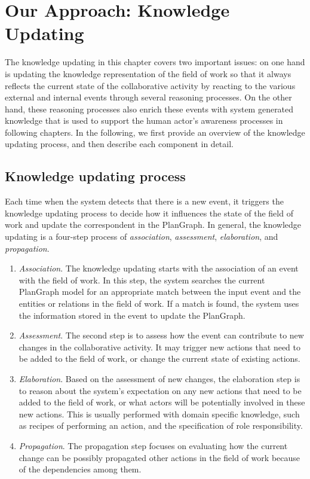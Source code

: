 \graphicspath{{Figures/}}

\chapter{Our Approach: Knowledge Updating} %
\label{cha:knowledge_updating}
The knowledge updating in this chapter covers two important issues: on one hand is updating the knowledge representation of the field of work so that it always reflects the current state of the collaborative activity by reacting to the various external and internal events through several reasoning processes. On the other hand, these reasoning processes also enrich these events with system generated knowledge that is used to support the human actor's awareness processes in following chapters. In the following, we first provide an overview of the knowledge updating process, and then describe each component in detail.

\section{Knowledge updating process} %
\label{sec:knowledge_updating_process}
Each time when the system detects that there is a new event, it triggers the knowledge updating process to decide how it influences the state of the field of work and update the correspondent in the PlanGraph. In general, the knowledge updating is a four-step process of \emph{association}, \emph{assessment}, \emph{elaboration}, and \emph{propagation}.
\begin{enumerate}
	\item \emph{Association}. The knowledge updating starts with the association of an event with the field of work. In this step, the system searches the current PlanGraph model for an appropriate match between the input event and the entities or relations in the field of work. If a match is found, the system uses the information stored in the event to update the PlanGraph.
	\item \emph{Assessment}. The second step is to assess how the event can contribute to new changes in the collaborative activity. It may trigger new actions that need to be added to the field of work, or change the current state of existing actions. 
	\item \emph{Elaboration}. Based on the assessment of new changes, the elaboration step is to reason about the system's expectation on any new actions that need to be added to the field of work, or what actors will be potentially involved in these new actions. This is usually performed with domain specific knowledge, such as recipes of performing an action, and the specification of role responsibility.
	\item \emph{Propagation}. The propagation step focuses on evaluating how the current change can be possibly propagated other actions in the field of work because of the dependencies among them. 
\end{enumerate}


